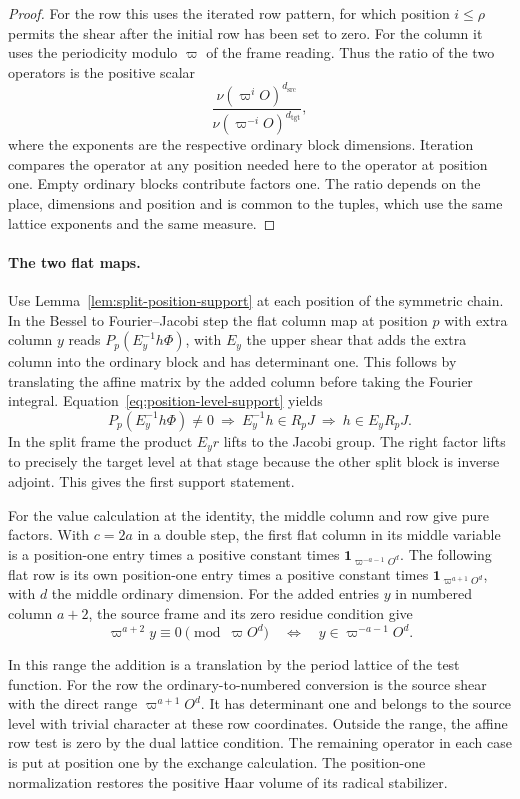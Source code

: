 \begin{proof}
For the row this uses the iterated row pattern, for which
position \(i\le\rho\) permits the shear after the initial
row has been set to zero. For the column it uses the
periodicity modulo \(\varpi\) of the frame reading.
Thus the ratio of the two operators is the positive scalar
\[
     \frac{\nu(\varpi^iO)^{d_{\mathrm{src}}}}
          {\nu(\varpi^{-i}O)^{d_{\mathrm{tgt}}}},
\]
where the exponents are the respective ordinary block
dimensions. Iteration compares the operator at any
position needed here to the operator at position one.
Empty ordinary blocks contribute factors one. The ratio
depends on the place, dimensions and position and is common
to the tuples, which use the same lattice exponents and
the same measure.
\end{proof}

\paragraph{The two flat maps.}
Use Lemma~\ref{lem:split-position-support} at each position of
the symmetric chain.
In the Bessel to Fourier--Jacobi step the flat column map
at position \(p\) with extra column \(y\) reads
\(P_p(E_y^{-1}h\Phi)\), with \(E_y\) the upper shear that
adds the extra column into the ordinary block and has
determinant one. This follows by translating the affine
matrix by the added column before taking the Fourier
integral. Equation~\eqref{eq:position-level-support} yields
\[
  P_p(E_y^{-1}h\Phi)\ne0
     \ \Longrightarrow\ E_y^{-1}h\in R_pJ
     \ \Longrightarrow\ h\in E_yR_pJ .
\]
In the split frame the product \(E_y r\) lifts to the
Jacobi group. The right factor lifts to precisely the
target level at that stage because the other split block
is inverse adjoint. This gives the first support statement.

For the value calculation at the identity, the middle
column and row give pure factors. With \(c=2a\) in a double
step, the first flat column in its middle variable is
a position-one entry times a positive constant times
\(\mathbf1_{\varpi^{-a-1}O^d}\). The following flat row is
its own position-one entry times a positive constant times
\(\mathbf1_{\varpi^{a+1}O^d}\), with \(d\) the middle
ordinary dimension. For the added entries \(y\) in numbered column \(a+2\), the
source frame and its zero residue condition give
\[
  \varpi^{a+2}y\equiv0\pmod{\varpi O^d}
         \quad\Longleftrightarrow\quad y\in\varpi^{-a-1}O^d .
\]

In this
range the addition is a translation by the period lattice
of the test function.
For the row the ordinary-to-numbered conversion is the
source shear with the direct range \(\varpi^{a+1}O^d\).
It has determinant one and belongs to the source level
with trivial character at these row coordinates. Outside
the range, the affine row test is zero by the dual lattice
condition. The remaining operator in each case is put at
position one by the exchange calculation. The position-one
normalization restores the positive Haar volume of its
radical stabilizer.

